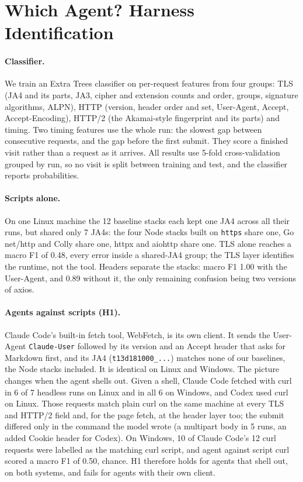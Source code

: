 
\section{Which Agent? Harness Identification}
\label{sec:harness}

\paragraph{Classifier.} We train an Extra Trees classifier on per-request features from four groups:
TLS (JA4 and its parts, JA3, cipher and extension counts and order, groups, signature algorithms,
ALPN), HTTP (version, header order and set, User-Agent, Accept, Accept-Encoding), HTTP/2 (the
Akamai-style fingerprint and its parts) and timing. Two timing features use the whole run: the slowest
gap between consecutive requests, and the gap before the first submit. They score a finished visit
rather than a request as it arrives. All results use 5-fold cross-validation grouped by run, so no
visit is split between training and test, and the classifier reports probabilities.

\paragraph{Scripts alone.} On one Linux machine the 12 baseline stacks each kept one JA4 across all
their runs, but shared only 7 JA4s: the four Node stacks built on \texttt{https} share one, Go net/http
and Colly share one, httpx and aiohttp share one. TLS alone reaches a macro F1 of 0.48, every error
inside a shared-JA4 group; the TLS layer identifies the runtime, not the tool. Headers separate the
stacks: macro F1 1.00 with the User-Agent, and 0.89 without it, the only remaining confusion being two
versions of axios.

\paragraph{Agents against scripts (H1).} Claude Code's built-in fetch tool, WebFetch, is its own client.
It sends the User-Agent \texttt{Claude-User} followed by its version and an Accept header that asks for Markdown
first, and its JA4 (\texttt{t13d181000\_...}) matches none of our baselines, the Node stacks included.
It is identical on Linux and Windows. The picture changes when the agent shells out. Given a shell,
Claude Code fetched with curl in 6 of 7 headless runs on Linux and in all 6 on Windows, and Codex used
curl on Linux. Those requests match plain curl on the same machine at every TLS and HTTP/2 field and,
for the page fetch, at the header layer too; the submit differed only in the command the model wrote
(a multipart body in 5 runs, an added Cookie header for Codex). On Windows, 10 of Claude Code's 12
curl requests were labelled as the matching curl script, and agent against script curl scored a macro
F1 of 0.50, chance. H1 therefore holds for agents that shell out, on both systems, and fails for
agents with their own client.

